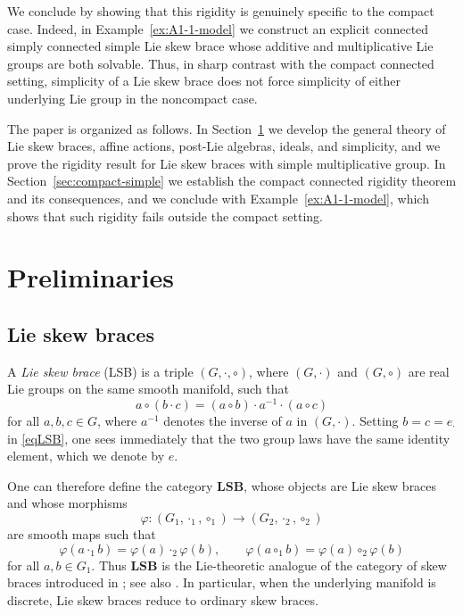 \documentclass[reqno]{amsart}
\begin{document}
We conclude by showing that this rigidity is genuinely specific to the
compact case. Indeed, in Example~\ref{ex:A1-1-model} we construct an
explicit connected simply connected simple Lie skew brace whose
additive and multiplicative Lie groups are both solvable. Thus, in
sharp contrast with the compact connected setting, simplicity of a Lie
skew brace does not force simplicity of either underlying Lie group in
the noncompact case.

The paper is organized as follows. In Section~\ref{secLSB} we develop
the general theory of Lie skew braces, affine actions, post-Lie
algebras, ideals, and simplicity, and we prove the rigidity result for
Lie skew braces with simple multiplicative group. In
Section~\ref{sec:compact-simple} we establish the compact connected
rigidity theorem and its consequences, and we conclude with
Example~\ref{ex:A1-1-model}, which shows  that such rigidity fails outside
the compact setting.

\section{Preliminaries}\label{secLSB}

\subsection{Lie skew braces}

A \emph{Lie skew brace} (LSB) is a triple $(G,\cdot,\circ)$, where
$(G,\cdot)$ and $(G,\circ)$ are real Lie groups on the same smooth manifold,
such that
\begin{equation}\label{eqLSB}
a\circ (b\cdot c)=(a\circ b)\cdot a^{-1}\cdot (a\circ c)
\end{equation}
for all $a,b,c\in G$, where $a^{-1}$ denotes the inverse of $a$ in
$(G,\cdot)$. Setting $b=c=e_{\cdot}$ in \eqref{eqLSB}, one sees immediately
that the two group laws have the same identity element, which we denote by $e$.

One can therefore define the category $\mathbf{LSB}$, whose objects are Lie
skew braces and whose morphisms
\[
\varphi:(G_1,\cdot_1,\circ_1)\longrightarrow (G_2,\cdot_2,\circ_2)
\]
are smooth maps such that
\[
\varphi(a\cdot_1 b)=\varphi(a)\cdot_2 \varphi(b),
\qquad
\varphi(a\circ_1 b)=\varphi(a)\circ_2 \varphi(b)
\]
for all $a,b\in G_1$. Thus $\mathbf{LSB}$ is the Lie-theoretic analogue of the
category of skew braces introduced in \cite{Guarnieri2017}; see also
\cite{Smoktunowicz2018}. In particular, when the underlying manifold is
discrete, Lie skew braces reduce to ordinary skew braces.
\end{document}
